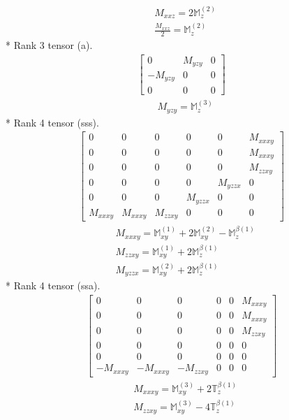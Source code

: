 \documentclass[fleqn,8pt,landscape]{jsarticle}
\begin{document}
\begin{align*}
& M_{xxz} = 2 \mathbb{M}_{z}^{(2)} \\
& \frac{M_{xxz}}{2} = \mathbb{M}_{z}^{(2)}
\end{align*}
* Rank 3 tensor (a).
\begin{align*}
\begin{bmatrix} 0 & M_{yzy} & 0 \\ - M_{yzy} & 0 & 0 \\ 0 & 0 & 0 \end{bmatrix}
\end{align*}
\begin{align*}
& M_{yzy} = \mathbb{M}_{z}^{(3)}
\end{align*}
* Rank 4 tensor (sss).
\begin{align*}
\begin{bmatrix} 0 & 0 & 0 & 0 & 0 & M_{xxxy} \\ 0 & 0 & 0 & 0 & 0 & M_{xxxy} \\ 0 & 0 & 0 & 0 & 0 & M_{zzxy} \\ 0 & 0 & 0 & 0 & M_{yzzx} & 0 \\ 0 & 0 & 0 & M_{yzzx} & 0 & 0 \\ M_{xxxy} & M_{xxxy} & M_{zzxy} & 0 & 0 & 0 \end{bmatrix}
\end{align*}
\begin{align*}
& M_{xxxy} = \mathbb{M}_{xy}^{(1)} + 2 \mathbb{M}_{xy}^{(2)} - \mathbb{M}_{z}^{\beta(1)} \\
& M_{zzxy} = \mathbb{M}_{xy}^{(1)} + 2 \mathbb{M}_{z}^{\beta(1)} \\
& M_{yzzx} = \mathbb{M}_{xy}^{(2)} + 2 \mathbb{M}_{z}^{\beta(1)}
\end{align*}
* Rank 4 tensor (ssa).
\begin{align*}
\begin{bmatrix} 0 & 0 & 0 & 0 & 0 & M_{xxxy} \\ 0 & 0 & 0 & 0 & 0 & M_{xxxy} \\ 0 & 0 & 0 & 0 & 0 & M_{zzxy} \\ 0 & 0 & 0 & 0 & 0 & 0 \\ 0 & 0 & 0 & 0 & 0 & 0 \\ - M_{xxxy} & - M_{xxxy} & - M_{zzxy} & 0 & 0 & 0 \end{bmatrix}
\end{align*}
\begin{align*}
& M_{xxxy} = \mathbb{M}_{xy}^{(3)} + 2 \mathbb{T}_{z}^{\beta(1)} \\
& M_{zzxy} = \mathbb{M}_{xy}^{(3)} - 4 \mathbb{T}_{z}^{\beta(1)}
\end{align*}
\end{document}
